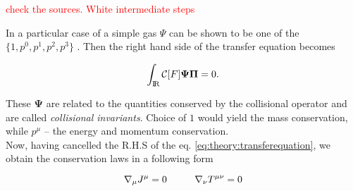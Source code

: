 \textcolor{red}{check the sources. White intermediate steps}

In a particular case of a simple gas $\Psi$ can be shown to be one of the $\{1,p^0,p^1,p^2,p^3\}$ \cite{Cercignani:2002}. Then the right hand side of the transfer equation becomes 

\begin{equation}
\int_{\text{I\!R}} \mathcal{C}[F]\boldsymbol{\Psi}\boldsymbol{\Pi} = 0.
\end{equation}

These $\boldsymbol{\Psi}$ are related to the quantities conserved by the collisional operator and are called \textit{collisional invariants}. Choice of $1$ would yield the mass conservation, while $p^{\mu}$ -- the energy and momentum conservation. \\

Now, having cancelled the R.H.S of the eq. \ref{eq:theory:transferequation}, we obtain the conservation laws in a following form

\begin{equation}
\nabla_{\mu}J^{\mu} =0 \hspace{10mm}\nabla_{\nu}T^{\mu\nu} =0
\end{equation}